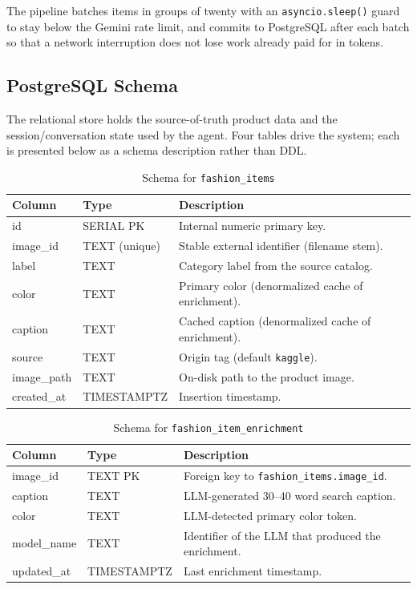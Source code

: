 The pipeline batches items in groups of twenty with an \texttt{asyncio.sleep()} guard to stay below the Gemini rate limit, and commits to PostgreSQL after each batch so that a network interruption does not lose work already paid for in tokens.

\subsection{PostgreSQL Schema}
\label{subsec:postgres_schema}

The relational store holds the source-of-truth product data and the session/conversation state used by the agent. Four tables drive the system; each is presented below as a schema description rather than DDL.

\begin{table}[H]
\centering
\begin{tabular}{p{3.5cm}p{2.3cm}p{8cm}}
\toprule
\textbf{Column} & \textbf{Type} & \textbf{Description}\\
\midrule
id            & SERIAL PK     & Internal numeric primary key.\\
image\_id     & TEXT (unique) & Stable external identifier (filename stem).\\
label         & TEXT          & Category label from the source catalog.\\
color         & TEXT          & Primary color (denormalized cache of enrichment).\\
caption       & TEXT          & Cached caption (denormalized cache of enrichment).\\
source        & TEXT          & Origin tag (default \texttt{kaggle}).\\
image\_path   & TEXT          & On-disk path to the product image.\\
created\_at   & TIMESTAMPTZ   & Insertion timestamp.\\
\bottomrule
\end{tabular}
\caption{Schema for \texttt{fashion\_items}}
\label{tab:schema_fashion_items}
\end{table}

\begin{table}[H]
\centering
\begin{tabular}{p{3.5cm}p{2.3cm}p{8cm}}
\toprule
\textbf{Column} & \textbf{Type} & \textbf{Description}\\
\midrule
image\_id    & TEXT PK      & Foreign key to \texttt{fashion\_items.image\_id}.\\
caption      & TEXT         & LLM-generated 30--40 word search caption.\\
color        & TEXT         & LLM-detected primary color token.\\
model\_name  & TEXT         & Identifier of the LLM that produced the enrichment.\\
updated\_at  & TIMESTAMPTZ  & Last enrichment timestamp.\\
\bottomrule
\end{tabular}
\caption{Schema for \texttt{fashion\_item\_enrichment}}
\label{tab:schema_enrichment}
\end{table}

